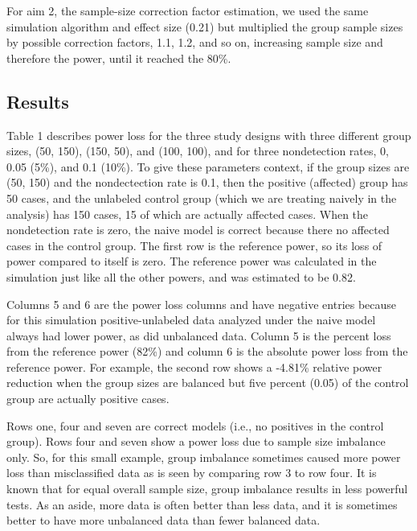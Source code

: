 \documentclass[
]{article}
\begin{document}
For aim 2, the sample-size correction factor estimation, we used the
same simulation algorithm and effect size (0.21) but multiplied the
group sample sizes by possible correction factors, 1.1, 1.2, and so on,
increasing sample size and therefore the power, until it reached the
80\%.

\pagebreak

\hypertarget{results-1}{%
\subsection{Results}\label{results-1}}

Table 1 describes power loss for the three study designs with three
different group sizes, (50, 150), (150, 50), and (100, 100), and for
three nondetection rates, 0, 0.05 (5\%), and 0.1 (10\%). To give these
parameters context, if the group sizes are (50, 150) and the
nondectection rate is 0.1, then the positive (affected) group has 50
cases, and the unlabeled control group (which we are treating naively in
the analysis) has 150 cases, 15 of which are actually affected cases.
When the nondetection rate is zero, the naive model is correct because
there no affected cases in the control group. The first row is the
reference power, so its loss of power compared to itself is zero. The
reference power was calculated in the simulation just like all the other
powers, and was estimated to be 0.82.

Columns 5 and 6 are the power loss columns and have negative entries
because for this simulation positive-unlabeled data analyzed under the
naive model always had lower power, as did unbalanced data. Column 5 is
the percent loss from the reference power (82\%) and column 6 is the
absolute power loss from the reference power. For example, the second
row shows a -4.81\% relative power reduction when the group sizes are
balanced but five percent (0.05) of the control group are actually
positive cases.

Rows one, four and seven are correct models (i.e., no positives in the
control group). Rows four and seven show a power loss due to sample size
imbalance only. So, for this small example, group imbalance sometimes
caused more power loss than misclassified data as is seen by comparing
row 3 to row four. It is known that for equal overall sample size, group
imbalance results in less powerful tests. As an aside, more data is
often better than less data, and it is sometimes better to have more
unbalanced data than fewer balanced data.
\end{document}
